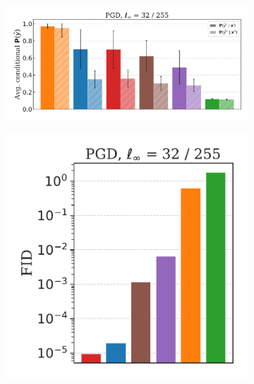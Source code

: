 \begin{figure}[H]

    \centering
    \begin{subfigure}[b]{0.5\textwidth}
        \centering
        \includegraphics[width=\textwidth]{img/results_discussion/adversarial/2_PGD_0.1255_thesis2.pdf}
    \end{subfigure}
    \hfill
    \begin{subfigure}[b]{0.23\textwidth}
        \centering
        \includegraphics[width=\textwidth]{img/results_discussion/adversarial/FID_barplot_0.1255_300.pdf}
    \end{subfigure}
    \begin{subfigure}[b]{0.23\textwidth}

\end{subfigure}
\end{figure}
